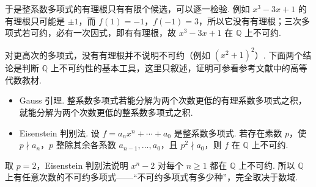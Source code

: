\documentclass[lang=cn,10.5pt,scheme=chinese,toc=twocol,section,chinesefont=nofont,
twoside,citestyle=gb7714-2015,bibstyle=gb7714-2015]{elegantbook}
\DeclareRobustCommand{\textbf}[1]{{\lnsemiboldlatin\lnsemiboldcjk #1}}
\numberwithin{equation}{section}   %
\begin{document}
于是整系数多项式的有理根只有有限个候选，可以逐一检验. 例如 $x^3-3x+1$ 的有理根只可能是 $\pm1$，而 $f(1)=-1$，$f(-1)=3$，所以它没有有理根；三次多项式若可约，必有一次因式，即有有理根，故 $x^3-3x+1$ 在 $\mathbb{Q}$ 上不可约.

对更高次的多项式，没有有理根并不说明不可约（例如 $(x^2+1)^2$）. 下面两个结论是判断 $\mathbb{Q}$ 上不可约性的基本工具，这里只叙述，证明可参看参考文献中的高等代数教材.

\begin{itemize}
  \item \textbf{Gauss 引理.} 整系数多项式若能分解为两个次数更低的有理系数多项式之积，就能分解为两个次数更低的\textbf{整系数}多项式之积.
  \item \textbf{Eisenstein 判别法.} 设 $f=a_nx^n+\cdots+a_0$ 是整系数多项式. 若存在素数 $p$，使 $p\nmid a_n$，$p$ 整除其余各系数 $a_{n-1},\ldots,a_0$，且 $p^2\nmid a_0$，则 $f$ 在 $\mathbb{Q}$ 上不可约.
\end{itemize}

取 $p=2$，Eisenstein 判别法说明 $x^n-2$ 对每个 $n\ge1$ 都在 $\mathbb{Q}$ 上不可约. 所以 $\mathbb{Q}$ 上有任意次数的不可约多项式——“不可约多项式有多少种”，完全取决于数域.
\end{document}
